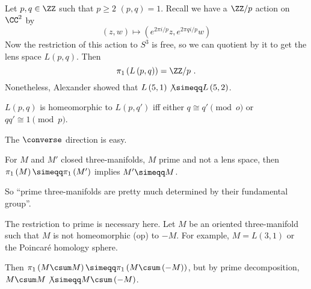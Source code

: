 \begin{exm}
Let $p,q\in \ZZ$ such that $p\geq 2$ $\left(p,q\right) = 1$. 
Recall we have a $\ZZ / p$ action on $\CC^2$ by 
\begin{equation*}
\left(z,w\right)\mapsto \left(e^{2\pi i / p} z , e^{2\pi q i/ p} w\right)
\end{equation*}
Now the restriction of this action to $S^3$ is free, so we can quotient by it to get the
lens space $L\left(p,q\right)$. Then
\begin{equation*}
\pi_1\left(L\left(p,q\right)\right) = \ZZ / p \ .
\end{equation*}
Nonetheless, Alexander showed that $L\left(5,1\right) \not\simeqq L\left(5,2\right)$.
\end{exm}

\begin{thm}[Redemeister]
$L\left(p,q\right)$ is homeomorphic to $L\left(p , q'\right)$ 
iff either $q\cong q'\pmod{o}$ or $qq'\cong 1\pmod{p}$.
\end{thm}

The $\converse$ direction is easy.

\begin{thm}
For $M$ and $M'$ closed three-manifolds, $M$ prime and not a lens space, then 
$\pi_1\left(M\right)\simeqq \pi_1\left(M'\right)$ implies $M'\simeqq M$.
\end{thm}

So ``prime three-manifolds are pretty much determined by their fundamental group''.

\begin{rmk}
The restriction to prime is necessary here.
Let $M$ be an oriented three-manifold such that $M$ is not homeomorphic (op) to $-M$. For
example, $M = L\left(3,1\right)$ or the Poincar\'e homology sphere.

Then $\pi_1\left(M\csum M\right)\simeqq \pi_1\left(M \csum \left(-M\right)\right)$, but by
prime decomposition, $M\csum M\not\simeqq M\csum \left(-M\right)$.
\end{rmk}
